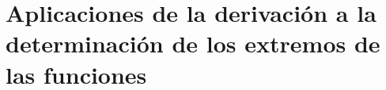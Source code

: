 \begin{comment}
    \item La ecuación $3x^2 + 3y^2 = 12$ define a $y$ implícitamente como dos funciones de $x$ si $|x| \leq 2$. Suponiendo que existe la segunda derivada $y"$, demuestre que satisface la ecuación $4y^3y" = - 9$.\\\\
	Demostración.-\; Derivamos teniendo en cuenta que debemos usar la regla de la cadena para derivar $y$ ya que es función de $x$,
	$$3x^2+4y^2=12\quad \Rightarrow \quad 6x+8yy'=0\quad \Rightarrow \quad y'=-\dfrac{3x}{4y}$$
	de donde 
	$$y''=\dfrac{-12y+12xy'}{16y^2}=\dfrac{-12y-\dfrac{9x^2}{4y}}{4y^2}=\dfrac{-12y^2-9x^2}{16y^2}=\dfrac{-3\left(4y^2+3x^2\right)}{16y^3}=-\dfrac{9}{4}y^{-3}.$$
	Por lo tanto,
	$$3y^3y''=9.$$\\

    \item La ecuación $x \sen xy + 2x^2 = 0$ define a $y$ implícitamente como una función de $x$. Suponiendo que existe la derivada $y'$, demuestre que satisface la ecuación $y'x^2 \cos xy + xy \cos xy + \sen xy + 4x = 0$.\\\\
	Demostración.-\; Derivamos la ecuación dada con respecto a $x$, teniendo en cuenta que $y$ es función de $x$, por lo que debemos usar la regla de la cadena,
	$$\begin{array}{rcl}
	    x\sen(xy)+2x^2=0&\Rightarrow&\left[x\sen (xy) + 2x^2\right]'=0\\
			    &\Rightarrow&\sen (xy) +x\left(xy'+y\right)\cos(xy)+4x=0\\
			    &\Rightarrow&y'x^2\cos(xy)+xy\cos(xy)+\sen(xy)+4x=0\\
	\end{array}$$
	\vspace{.7cm}

    \item Si $y = x^r$, donde $r$ es un número racional, digamos $r = m/n$, entonces $y^n = x^m$. Suponiendo la existencia de la derivada $y'$, obtenga la fórmula $y' = rx^{r-1}$ utilizando la diferenciación implícita y la fórmula correspondiente para exponentes enteros.\\\\
	Demostración.-\; Sean $y=r^r$, $y^n=x^m$ y $r=\dfrac{m}{n}\; \Rightarrow \; m=nr$, entonces
	$$ny^{n-1}y'=mx^{m-1}\quad \Rightarrow \quad y'=\dfrac{mx^{m-1}}{ny^{n-1}}=\dfrac{m}{n} \dfrac{x^{m-1}}{\left(x^r\right)^{n-1}}=\dfrac{m}{n} \dfrac{x^{m-1}}{x^{nr-r}}=rx^{m-1-m+r}=rx^{r-1}.$$\\

\end{enumerate}

\end{comment}

\section{Aplicaciones de la derivación a la determinación de los extremos de las funciones}
